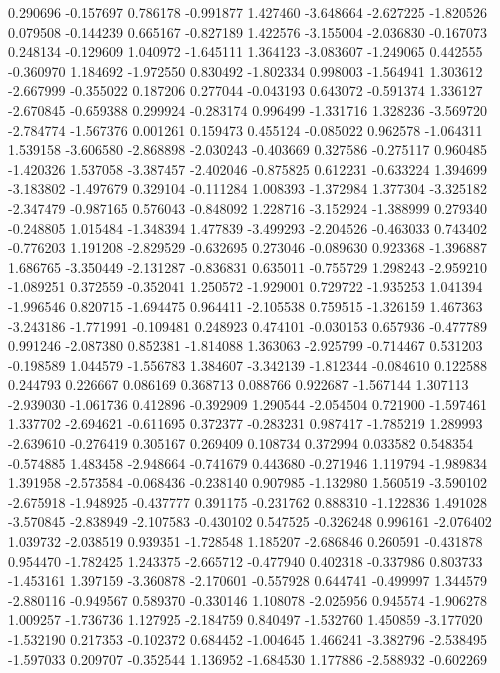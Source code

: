 0.290696
-0.157697
0.786178
-0.991877
1.427460
-3.648664
-2.627225
-1.820526
0.079508
-0.144239
0.665167
-0.827189
1.422576
-3.155004
-2.036830
-0.167073
0.248134
-0.129609
1.040972
-1.645111
1.364123
-3.083607
-1.249065
0.442555
-0.360970
1.184692
-1.972550
0.830492
-1.802334
0.998003
-1.564941
1.303612
-2.667999
-0.355022
0.187206
0.277044
-0.043193
0.643072
-0.591374
1.336127
-2.670845
-0.659388
0.299924
-0.283174
0.996499
-1.331716
1.328236
-3.569720
-2.784774
-1.567376
0.001261
0.159473
0.455124
-0.085022
0.962578
-1.064311
1.539158
-3.606580
-2.868898
-2.030243
-0.403669
0.327586
-0.275117
0.960485
-1.420326
1.537058
-3.387457
-2.402046
-0.875825
0.612231
-0.633224
1.394699
-3.183802
-1.497679
0.329104
-0.111284
1.008393
-1.372984
1.377304
-3.325182
-2.347479
-0.987165
0.576043
-0.848092
1.228716
-3.152924
-1.388999
0.279340
-0.248805
1.015484
-1.348394
1.477839
-3.499293
-2.204526
-0.463033
0.743402
-0.776203
1.191208
-2.829529
-0.632695
0.273046
-0.089630
0.923368
-1.396887
1.686765
-3.350449
-2.131287
-0.836831
0.635011
-0.755729
1.298243
-2.959210
-1.089251
0.372559
-0.352041
1.250572
-1.929001
0.729722
-1.935253
1.041394
-1.996546
0.820715
-1.694475
0.964411
-2.105538
0.759515
-1.326159
1.467363
-3.243186
-1.771991
-0.109481
0.248923
0.474101
-0.030153
0.657936
-0.477789
0.991246
-2.087380
0.852381
-1.814088
1.363063
-2.925799
-0.714467
0.531203
-0.198589
1.044579
-1.556783
1.384607
-3.342139
-1.812344
-0.084610
0.122588
0.244793
0.226667
0.086169
0.368713
0.088766
0.922687
-1.567144
1.307113
-2.939030
-1.061736
0.412896
-0.392909
1.290544
-2.054504
0.721900
-1.597461
1.337702
-2.694621
-0.611695
0.372377
-0.283231
0.987417
-1.785219
1.289993
-2.639610
-0.276419
0.305167
0.269409
0.108734
0.372994
0.033582
0.548354
-0.574885
1.483458
-2.948664
-0.741679
0.443680
-0.271946
1.119794
-1.989834
1.391958
-2.573584
-0.068436
-0.238140
0.907985
-1.132980
1.560519
-3.590102
-2.675918
-1.948925
-0.437777
0.391175
-0.231762
0.888310
-1.122836
1.491028
-3.570845
-2.838949
-2.107583
-0.430102
0.547525
-0.326248
0.996161
-2.076402
1.039732
-2.038519
0.939351
-1.728548
1.185207
-2.686846
0.260591
-0.431878
0.954470
-1.782425
1.243375
-2.665712
-0.477940
0.402318
-0.337986
0.803733
-1.453161
1.397159
-3.360878
-2.170601
-0.557928
0.644741
-0.499997
1.344579
-2.880116
-0.949567
0.589370
-0.330146
1.108078
-2.025956
0.945574
-1.906278
1.009257
-1.736736
1.127925
-2.184759
0.840497
-1.532760
1.450859
-3.177020
-1.532190
0.217353
-0.102372
0.684452
-1.004645
1.466241
-3.382796
-2.538495
-1.597033
0.209707
-0.352544
1.136952
-1.684530
1.177886
-2.588932
-0.602269
